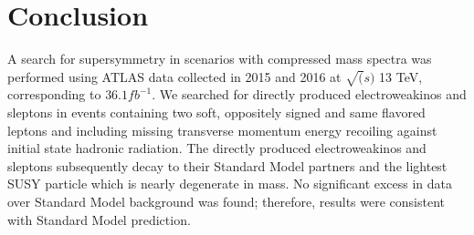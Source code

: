 \chapter{Conclusion}
\label{ch:conclusion}
A search for supersymmetry in scenarios with compressed mass spectra was performed using ATLAS data collected in 2015 and 2016 at $\sqrt(s)$ 13 TeV, corresponding to $36.1 fb^{-1}$.  We searched for directly produced electroweakinos and sleptons in events containing two soft, oppositely signed and same flavored leptons and including missing transverse momentum energy recoiling against initial state hadronic radiation.  The directly produced electroweakinos and sleptons subsequently decay to their Standard Model partners and the lightest SUSY particle which is nearly degenerate in mass.  No significant excess in data over Standard Model background was found; therefore, results were consistent with Standard Model prediction. 

